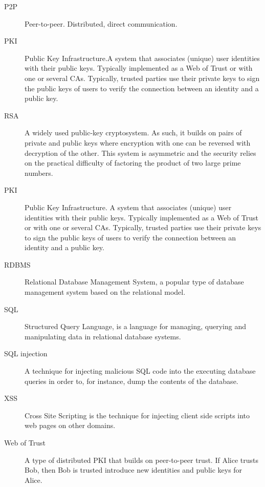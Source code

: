\begin{description}
  \item[P2P] Peer-to-peer. Distributed, direct communication.
  \item[PKI] Public Key Infrastructure.A system that associates (unique) user identities with their public keys. Typically implemented as a Web of Trust or with one or several CAs. Typically, trusted parties use their private keys to sign the public keys of users to verify the connection between an identity and a public key.
  \item[RSA] A widely used public-key cryptosystem. As such, it builds on pairs of private and public keys where encryption with one can be reversed with decryption of the other. This system is asymmetric and the security relies on the practical difficulty of factoring the product of two large prime numbers.
  \item[PKI] Public Key Infrastructure. A system that associates (unique) user identities with their public keys. Typically implemented as a Web of Trust or with one or several CAs. Typically, trusted parties use their private keys to sign the public keys of users to verify the connection between an identity and a public key.
  \item[RDBMS] Relational Database Management System, a popular type of database management system based on the relational model.
  \item[SQL] Structured Query Language, is a language for managing, querying and manipulating data in relational database systems.
  \item[SQL injection] A technique for injecting malicious SQL code into the executing database queries in order to, for instance, dump the contents of the database.
  \item[XSS] Cross Site Scripting is the technique for injecting client side scripts into web pages on other domains.
  \item[Web of Trust] A type of distributed PKI that builds on peer-to-peer trust. If Alice trusts Bob, then Bob is trusted introduce new identities and public keys for Alice.
\end{description}

